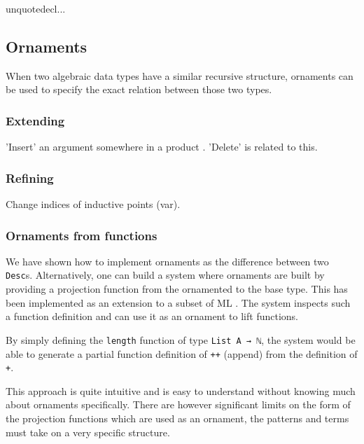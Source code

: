 unquotedecl...


\subsection{Ornaments}\label{sec:lit-ornaments}

When two algebraic data types have a similar recursive structure,
ornaments can be used to specify the exact relation between those two
types.

\subsubsection{Extending}

'Insert' an argument somewhere in a product \cite{dagand14-transporting}.
'Delete' is related to this.

\subsubsection{Refining}

Change indices of inductive points (var).

\subsubsection{Ornaments from functions}

We have shown how to implement ornaments as the difference between two
\texttt{Desc}s.
Alternatively, one can build a system where ornaments are built by
providing a projection function from the ornamented to the base type.
This has been implemented as an extension to a subset of ML
\cite{williams14}.
The system inspects such a function definition and can use it as an
ornament to lift functions.

\begin{example}
By simply defining the \texttt{length} function of type \texttt{List A
  → ℕ}, the system would be able to generate a partial function
definition of \texttt{++} (append) from the definition of \texttt{+}.
\end{example}

This approach is quite intuitive and is easy to understand without
knowing much about ornaments specifically.
There are however significant limits on the form of the projection
functions which are used as an ornament, the patterns and terms must
take on a very specific structure.

